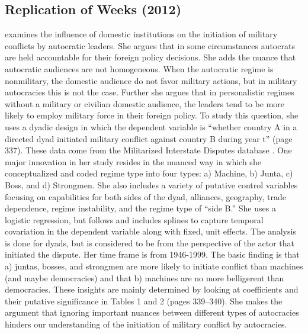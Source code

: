 \documentclass[12pt]{amsart}
\begin{document}
\subsection{Replication of Weeks (2012)}

\citet{weeks:2012} examines the influence of domestic institutions on the initiation of military conflicts by autocratic leaders.  She argues that in some circumstances autocrats are held accountable for their foreign policy decisions. She adds the nuance that autocratic audiences are not homogeneous. When the autocratic regime is nonmilitary, the domestic audience do not favor military actions, but in military autocracies this is not the case. Further she argues that in personalistic regimes without a military or civilian domestic audience, the leaders tend to be more likely to employ military force in their foreign policy.  To study this question, she uses a dyadic design in which the dependent variable is ``whether country A in a directed dyad initiated military conflict against country B during year t'' (page 337).  These data come from the Militarized Interstate Disputes database \citep{maoz:2005}.  One major innovation in her study resides in the nuanced way in which she conceptualized and coded regime type into four types: a) Machine, b) Junta, c) Boss, and d) Strongmen. She also includes a variety of putative control variables focusing on capabilities for both sides of the dyad, alliances, geography, trade dependence, regime instability, and the regime type of ``side B.''  She uses a logistic regression, but follows \citet{beck:etal:1998} and includes splines to capture temporal covariation in the dependent variable along with  fixed, unit effects. The analysis is done for dyads, but is considered to be from the perspective of the actor that initiated the dispute. Her time frame is from 1946-1999.  The basic finding is that a) juntas, bosses, and strongmen are more likely to initiate conflict than machines (and maybe democracies) and that b) machines are no more belligerent than democracies.  These insights are mainly determined by looking at coefficients and their putative significance in Tables 1 and 2 (pages 339--340). She makes the argument that ignoring important nuances between different types of autocracies hinders our understanding of the initiation of military conflict by autocracies. 
\end{document}
